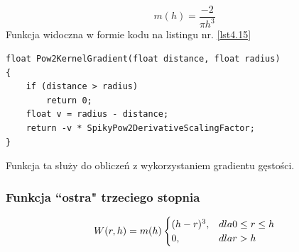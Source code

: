 \documentclass{article}
\begin{document}
\begin{center}
\newline
\caption{Rysunek 10: Gradient funkcji drugiego stopnia}
\label{functions_3}
\end{center}

\begin{equation}\label{eqn30}
m(h) = \frac{-2}{\pi h^3}
\end{equation}
\newline
Funkcja widoczna w formie kodu na listingu nr. \ref{lst4.15}\newline

\begin{lstlisting}[caption=Gradient funkcji drugiego stopnia, label={lst4.15}]
float Pow2KernelGradient(float distance, float radius)
{
	if (distance > radius)
        return 0;
	float v = radius - distance;
	return -v * SpikyPow2DerivativeScalingFactor;
}
\end{lstlisting}
\noindent
Funkcja ta służy do obliczeń z wykorzystaniem gradientu gęstości.\newline
\newpage
\subsubsection{Funkcja ``ostra" trzeciego stopnia}
\begin{equation}\label{eqn31}
W(r,h) = m(h)
\begin{cases}
(h-r)^3, & dla \space 0 \leq r \leq h\\
0, & dla \space r > h
\end{cases}
\end{equation}
\end{document}
